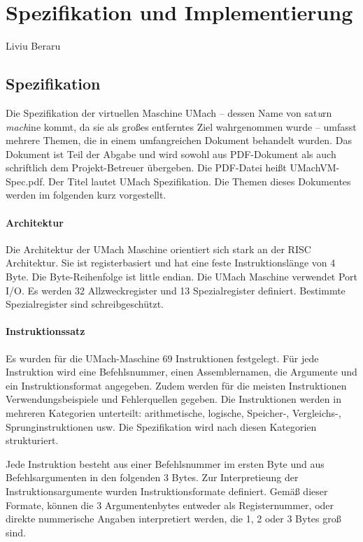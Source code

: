 \section{Spezifikation und Implementierung}
\begin{flushright}
Liviu Beraru
\end{flushright}

\subsection{Spezifikation}
Die Spezifikation der virtuellen Maschine UMach -- dessen Name von
\glqq{}sat\emph{u}rn \emph{mach}ine\grqq{} kommt, da sie als großes entferntes
Ziel wahrgenommen wurde -- umfasst mehrere Themen, die in einem umfangreichen
Dokument behandelt wurden. Das Dokument ist Teil der Abgabe und wird sowohl aus
PDF-Dokument als auch schriftlich dem Projekt-Betreuer übergeben. Die PDF-Datei
heißt \glqq{}UMachVM-Spec.pdf\grqq{}. Der Titel lautet \glqq{}UMach
Spezifikation\grqq. Die Themen dieses Dokumentes werden im folgenden kurz
vorgestellt.


\paragraph{Architektur}
Die Architektur der UMach Maschine orientiert sich stark an der RISC
Architektur. Sie ist registerbasiert und hat eine feste Instruktionslänge von 4
Byte. Die Byte-Reihenfolge ist \glqq{}little endian\grqq{}. Die UMach Maschine
verwendet Port I/O. Es werden 32 Allzweckregister und 13 Spezialregister
definiert. Bestimmte Spezialregister sind schreibgeschützt.



\paragraph{Instruktionssatz}
Es wurden für die UMach-Maschine 69 Instruktionen festgelegt. Für jede
Instruktion wird eine Befehlsnummer, einen Assemblernamen, die Argumente und ein
Instruktionsformat angegeben. Zudem werden für die meisten Instruktionen
Verwendungsbeispiele und Fehlerquellen gegeben. Die Instruktionen werden in
mehreren Kategorien unterteilt: arithmetische, logische, Speicher-, Vergleichs-,
Sprunginstruktionen usw. Die Spezifikation wird nach diesen Kategorien
strukturiert.

Jede Instruktion besteht aus einer Befehlsnummer im ersten Byte und aus
Befehlsargumenten in den folgenden 3 Bytes. Zur Interpretieung der
Instruktionsargumente wurden Instruktionsformate definiert. Gemäß dieser
Formate, können die 3 Argumentenbytes entweder als Registernummer, oder direkte
nummerische Angaben interpretiert werden, die 1, 2 oder 3 Bytes groß sind.



